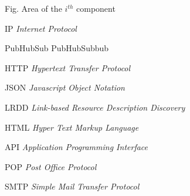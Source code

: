\begin{siglas}
  \item[Fig.] Area of the $i^{th}$ component
  \item[IP] \textit{Internet Protocol}
  \item[PubHubSub] PubHubSubbub
  \item[HTTP] \textit{Hypertext Transfer Protocol}
  \item[JSON] \textit{Javascript Object Notation}
  \item[LRDD] \textit{Link-based Resource Description Discovery}
  \item[HTML] \textit{Hyper Text Markup Language}
  \item[API] \textit{Application Programming Interface}
  \item[POP] \textit{Post Office Protocol}
  \item[SMTP] \textit{Simple Mail Transfer Protocol}
\end{siglas}
